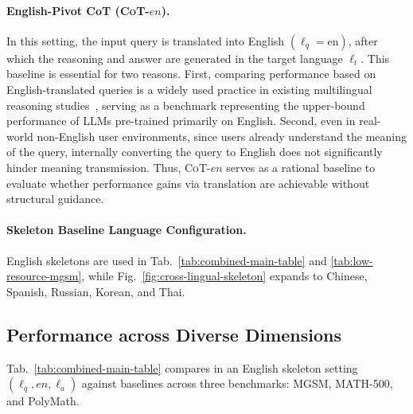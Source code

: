 \paragraph{English-Pivot CoT (\textsc{CoT-$en$}).} In this setting, the input query is translated into English $(\ell_q=\text{en})$, after which the reasoning and answer are generated in the target language $\ell_t$. This baseline is essential for two reasons. First, comparing performance based on English-translated queries is a widely used practice in existing multilingual reasoning studies~\citep{clp-emnlp2023,xlt-emnlp2023,trans-allneed-2025naacl}, serving as a benchmark representing the upper-bound performance of LLMs pre-trained primarily on English. Second, even in real-world non-English user environments, since users already understand the meaning of the query, internally converting the query to English does not significantly hinder meaning transmission. Thus, \textsc{CoT-$en$} serves as a rational baseline to evaluate whether performance gains via translation are achievable without structural guidance.

\paragraph{Skeleton Baseline Language Configuration.} 
English skeletons are used in Tab.~\ref{tab:combined-main-table} and \ref{tab:low-resource-mgsm}, while Fig.~\ref{fig:cross-lingual-skeleton} expands to Chinese, Spanish, Russian, Korean, and Thai.

\subsection{Performance across Diverse Dimensions}
Tab.~\ref{tab:combined-main-table} compares \LASEF in an English skeleton setting $(\ell_q, en, \ell_a)$ against baselines across three benchmarks: MGSM, MATH-500, and PolyMath.


